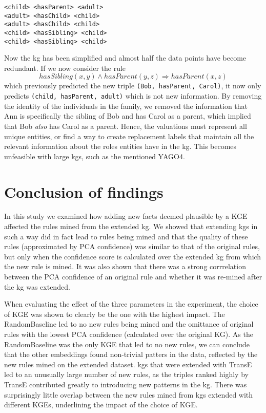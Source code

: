 \begin{example}
\begin{lstlisting}[]
<child> <hasParent> <adult>
<adult> <hasChild> <child>
<adult> <hasChild> <child>
<child> <hasSibling> <child>
<child> <hasSibling> <child>
\end{lstlisting}
\label{mini_simple_KG_rules}
\end{example}

Now the \gls{kg} has been simplified and almost half the data points have become redundant. If we now consider the rule \[hasSibling(x, y) \wedge hasParent(y,z) \Rightarrow hasParent(x,z)\] which previously predicted the new triple \texttt{(Bob, hasParent, Carol)}, it now only predicts \texttt{(child, hasParent, adult)} which is not new information. By removing the identity of the individuals in the family, we removed the information that Ann is specifically the sibling of Bob and has Carol as a parent, which implied that Bob \textit{also} has Carol as a parent. Hence, the valuations must represent all unique entities, or find a way to create replacement labels that maintain all the relevant information about the roles entities have in the \gls{kg}. This becomes unfeasible with large \glspl{kg}, such as the mentioned YAGO4.


\section{Conclusion of findings}
In this study we examined how adding new facts deemed plausible by a KGE affected the rules mined from the extended \gls{kg}. We showed that extending \glspl{kg} in such a way did in fact lead to rules being mined and that the quality of these rules (approximated by PCA confidence) was similar to that of the original rules, but only when the confidence score is calculated over the extended \gls{kg} from which the new rule is mined. It was also shown that there was a strong corrrelation between the PCA confidence of an original rule and whether it was re-mined after the \gls{kg} was extended.

When evaluating the effect of the three parameters in the experiment, the choice of KGE was shown to clearly be the one with the highest impact. The RandomBaseline led to no new rules being mined and the omittance of original rules with the lowest PCA confidence (calculated over the original KG). As the RandomBaseline was the only KGE that led to no new rules, we can conclude that the other embeddings found non-trivial patters in the data, reflected by the new rules mined on the extended dataset. \glspl{kg} that were extended with TransE led to an unusually large number of new rules, as the triples ranked highly by TransE contributed greatly to introducing new patterns in the \gls{kg}. There was surprisingly little overlap between the new rules mined from \glspl{kg} extended with different KGEs, underlining the impact of the choice of KGE.

